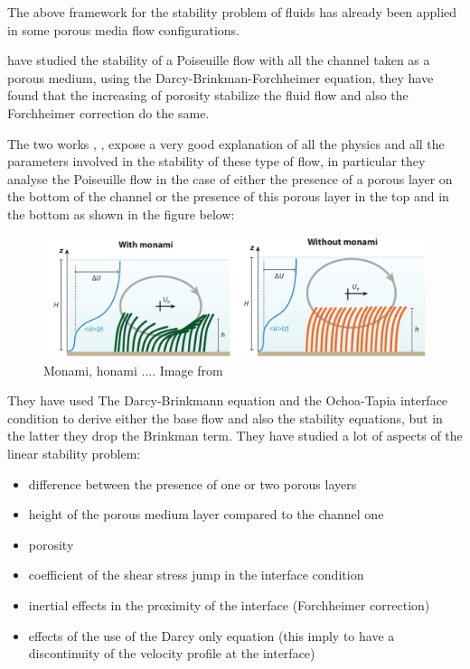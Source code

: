 The above framework for the stability problem of fluids has already been applied in some porous media flow configurations. 

\citet{avramenko2005investigation} have studied the stability of a Poiseuille flow with all the channel taken as a porous medium, using the Darcy-Brinkman-Forchheimer equation, they have found that the increasing of porosity stabilize the fluid flow and also the Forchheimer correction do the same. 

The two works \citet{tilton2006destabilizing}, \citet{tilton2008linear}, expose a very good explanation of all the physics and all the parameters involved in the stability of these type of flow, in particular they analyse the Poiseuille flow in the case of either the presence of a porous layer on the bottom of the channel or the presence of this porous layer in the top and in the bottom as shown in the figure below:

\begin{figure}[h]
	\centering
	\includegraphics[width=1\linewidth]{chapter_1/monami}
	\caption{Monami, honami .... Image from \citet{nepf2012flow}}
	\label{fig:monami}
\end{figure}

They have used The Darcy-Brinkmann equation and the Ochoa-Tapia interface condition to derive either the base flow and also the stability equations, but in the latter they drop the Brinkman term.
They have studied a lot of aspects of the linear stability problem:
\begin{itemize}
	\item difference between the presence of one or two porous layers
	\item height of the porous medium layer compared to the channel one
	\item porosity 
	\item coefficient of the shear stress jump in the interface condition
	\item inertial effects in the proximity of the interface (Forchheimer correction)
	\item effects of the use of the Darcy only equation (this imply to have a discontinuity of the velocity profile at the interface)
\end{itemize}

